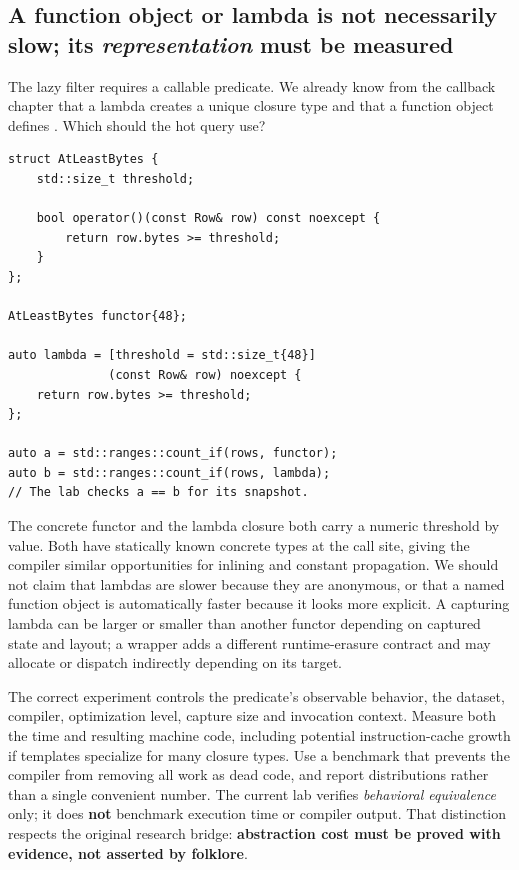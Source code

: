\subsection{\texorpdfstring{A function object or lambda is not necessarily slow; its \emph{representation} must be measured}{A function object or lambda is not necessarily slow; its representation must be measured}}\label{01-foundations-i-ch006-a-function-object-or-lambda-is-not-necessarily-slow-its-representation-must-be-measured}

\hypertarget{01-foundations-i-ch006-a-function-object-or-lambda-is-not-necessarily-slow-its-representation-must-be-measured}{}

The lazy filter requires a callable predicate. We already know from the callback chapter that a lambda creates a unique closure type and that a function object defines . Which should the hot query use?

\begin{verbatim}
struct AtLeastBytes {
    std::size_t threshold;

    bool operator()(const Row& row) const noexcept {
        return row.bytes >= threshold;
    }
};

AtLeastBytes functor{48};

auto lambda = [threshold = std::size_t{48}]
              (const Row& row) noexcept {
    return row.bytes >= threshold;
};

auto a = std::ranges::count_if(rows, functor);
auto b = std::ranges::count_if(rows, lambda);
// The lab checks a == b for its snapshot.
\end{verbatim}

The concrete functor and the lambda closure both carry a numeric threshold by value. Both have statically known concrete types at the  call site, giving the compiler similar opportunities for inlining and constant propagation. We should not claim that lambdas are slower because they are anonymous, or that a named function object is automatically faster because it looks more explicit. A capturing lambda can be larger or smaller than another functor depending on captured state and layout; a  wrapper adds a different runtime-erasure contract and may allocate or dispatch indirectly depending on its target.

The correct experiment controls the predicate's observable behavior, the dataset, compiler, optimization level, capture size and invocation context. Measure both the time and resulting machine code, including potential instruction-cache growth if templates specialize for many closure types. Use a benchmark that prevents the compiler from removing all work as dead code, and report distributions rather than a single convenient number. The current lab verifies \emph{behavioral equivalence} only; it does \textbf{not} benchmark execution time or compiler output. That distinction respects the original research bridge: \textbf{abstraction cost must be proved with evidence, not asserted by folklore}.

